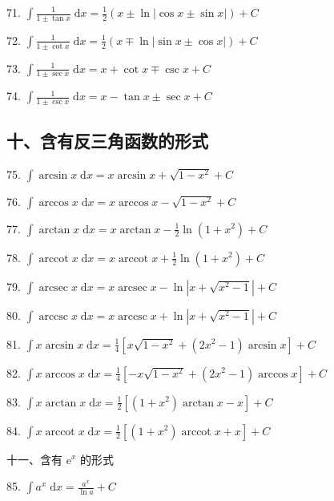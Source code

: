 71. \(\int \frac{1}{1 \pm  \tan x}\mathrm{\;d}x = \frac{1}{2}\left( {x \pm  \ln \left| {\cos x \pm  \sin x}\right| }\right)  + C\)

72. \(\int \frac{1}{1 \pm  \cot x}\mathrm{\;d}x = \frac{1}{2}\left( {x \mp  \ln \left| {\sin x \pm  \cos x}\right| }\right)  + C\)

73. \(\int \frac{1}{1 \pm  \sec x}\mathrm{\;d}x = x + \cot x \mp  \csc x + C\)

74. \(\int \frac{1}{1 \pm  \csc x}\mathrm{\;d}x = x - \tan x \pm  \sec x + C\)

\subsection{十、含有反三角函数的形式}

75. \(\int \arcsin x\mathrm{\;d}x = x\arcsin x + \sqrt{1 - {x}^{2}} + C\)

76. \(\int \arccos x\mathrm{\;d}x = x\arccos x - \sqrt{1 - {x}^{2}} + C\)

77. \(\int \arctan x\mathrm{\;d}x = x\arctan x - \frac{1}{2}\ln \left( {1 + {x}^{2}}\right)  + C\)

78. \(\int \operatorname{arccot}x\mathrm{\;d}x = x\operatorname{arccot}x + \frac{1}{2}\ln \left( {1 + {x}^{2}}\right)  + C\)

79. \(\int \operatorname{arcsec}x\mathrm{\;d}x = x\operatorname{arcsec}x - \ln \left| {x + \sqrt{{x}^{2} - 1}}\right|  + C\)

80. \(\int \operatorname{arccsc}x\mathrm{\;d}x = x\operatorname{arccsc}x + \ln \left| {x + \sqrt{{x}^{2} - 1}}\right|  + C\)

81. \(\int x\arcsin x\mathrm{\;d}x = \frac{1}{4}\left\lbrack  {x\sqrt{1 - {x}^{2}} + \left( {2{x}^{2} - 1}\right) \arcsin x}\right\rbrack   + C\)

82. \(\int x\arccos x\mathrm{\;d}x = \frac{1}{4}\left\lbrack  {-x\sqrt{1 - {x}^{2}} + \left( {2{x}^{2} - 1}\right) \arccos x}\right\rbrack   + C\)

83. \(\int x\arctan x\mathrm{\;d}x = \frac{1}{2}\left\lbrack  {\left( {1 + {x}^{2}}\right) \arctan x - x}\right\rbrack   + C\)

84. \(\int x\operatorname{arccot}x\mathrm{\;d}x = \frac{1}{2}\left\lbrack  {\left( {1 + {x}^{2}}\right) \operatorname{arccot}x + x}\right\rbrack   + C\)

十一、含有 \({\mathrm{e}}^{x}\) 的形式

85. \(\int {a}^{x}\mathrm{\;d}x = \frac{{a}^{x}}{\ln a} + C\)

